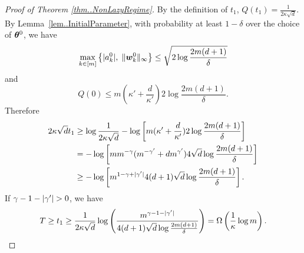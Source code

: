 \documentclass{article}
\begin{document}
\begin{proof}[Proof of Theorem \ref{thm..NonLazyRegime}]
    By the definition of $t_1$, $Q(t_1)=\frac{1}{2\kappa\sqrt{d}}$. By Lemma~\ref{lem..InitialParameter}, with probability at least $1-\delta$ over the choice of $\bm{\theta}^0$, we have
    \begin{equation*}
        \max\limits_{k\in[m]}\left\{\lvert a_k^0\rvert,\;\lVert\bm{w}_k^0\rVert_{\infty}\right \}\leq\sqrt{2\log\frac{2m(d+1)}{\delta}}
    \end{equation*}
    and
    \begin{equation*}
        Q(0)\leq m(\kappa'+\frac{d}{\kappa'})2\log\frac{2m(d+1)}{\delta}.
    \end{equation*}
    Therefore
    \begin{equation*}
        \begin{aligned}
            2\kappa\sqrt{d}t_1
             & \geq \log\frac{1}{2\kappa\sqrt{d}} - \log\left[m(\kappa'+\frac{d}{\kappa'})2\log\frac{2m(d+1)}{\delta}\right] \\
             & = -\log\left[mm^{-\gamma}(m^{-\gamma'}+dm^{\gamma'})4\sqrt{d}\log\frac{2m(d+1)}{\delta}\right]                \\
             & \geq - \log\left[m^{1-\gamma+\lvert\gamma'\rvert}4(d+1)\sqrt{d}\log\frac{2m(d+1)}{\delta}\right].
        \end{aligned}
    \end{equation*}
    If $\gamma-1-\lvert\gamma'\rvert>0$, we have
    \begin{equation*}
        T\geq t_1\geq \frac{1}{2\kappa\sqrt{d}}\log\left(\frac{m^{\gamma-1-\lvert\gamma'\rvert}}{4(d+1)\sqrt{d}\log\frac{2m(d+1)}{\delta}}\right) = \Omega\left(\frac{1}{\kappa}\log m\right).
    \end{equation*}
\end{proof}


\end{document}
